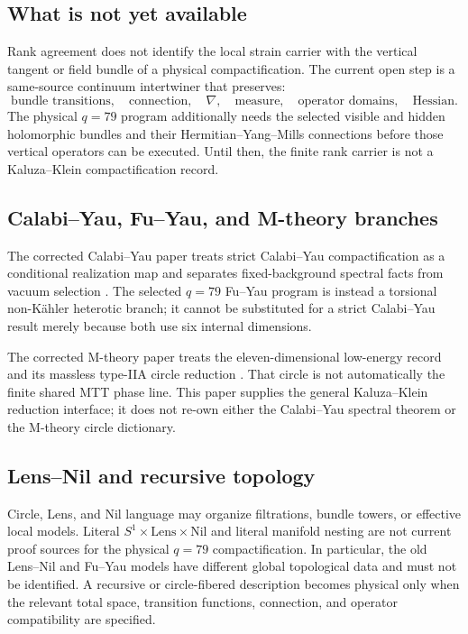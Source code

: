 \documentclass[11pt]{article}
\theoremstyle{definition}
\theoremstyle{remark}
\begin{document}
\subsection{What is not yet available}

Rank agreement does not identify the local strain carrier with the vertical
tangent or field bundle of a physical compactification.  The current open
step is a same-source continuum intertwiner that preserves:
\[
\text{bundle transitions},\quad
\text{connection},\quad
\nabla,\quad
\text{measure},\quad
\text{operator domains},\quad
\text{Hessian}.
\]
The physical \(q=79\) program additionally needs the selected visible and
hidden holomorphic bundles and their Hermitian--Yang--Mills connections
before those vertical operators can be executed.  Until then, the finite
rank carrier is not a Kaluza--Klein compactification record.

\subsection{Calabi--Yau, Fu--Yau, and M-theory branches}

The corrected Calabi--Yau paper treats strict Calabi--Yau compactification as
a conditional realization map and separates fixed-background spectral
facts from vacuum selection \cite{NeroCalabiYau}.  The selected \(q=79\)
Fu--Yau program is instead a torsional non-K\"ahler heterotic branch; it
cannot be substituted for a strict Calabi--Yau result merely because both
use six internal dimensions.

The corrected M-theory paper treats the eleven-dimensional low-energy
record and its massless type-IIA circle reduction
\cite{NeroMTheory}.  That circle is not automatically the finite shared MTT
phase line.  This paper supplies the general Kaluza--Klein reduction
interface; it does not re-own either the Calabi--Yau spectral theorem or the
M-theory circle dictionary.

\subsection{Lens--Nil and recursive topology}

Circle, Lens, and Nil language may organize filtrations, bundle towers, or
effective local models.  Literal
\(S^1\times\mathrm{Lens}\times\mathrm{Nil}\) and literal manifold nesting are
not current proof sources for the physical \(q=79\) compactification.  In
particular, the old Lens--Nil and Fu--Yau models have different global
topological data and must not be identified.  A recursive or
circle-fibered description becomes physical only when the relevant total
space, transition functions, connection, and operator compatibility are
specified.
\end{document}
